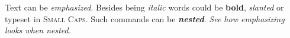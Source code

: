 \documentclass{article}
\begin{document}
{\sffamily
Text can be {\em emphasized}.
Besides being {\itshape italic} words could be {\bfseries bold},
{\slshape slanted} or typeset in {\scshape Small Caps}.
Such commands can be {\itshape\bfseries nested}.}
{\em See how {\em emphasizing} looks when nested.}
\end{document}
